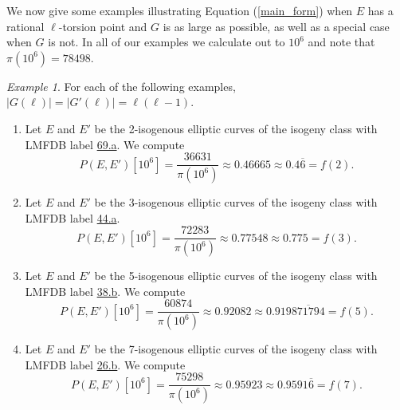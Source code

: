 \documentclass{amsart}
\numberwithin{equation}{section}
\theoremstyle{plain}
\theoremstyle{remark}
\newtheorem{exm}[equation]{Example}
\begin{document}
We now give some examples illustrating Equation (\ref{main_form}) when $E$ has a rational $\ell$-torsion point and $G$ is as large as possible, as well as a special case when $G$ is not.  In all of our examples we calculate out to $10^6$ and note that $\pi(10^6) = 78498$.

\begin{exm} For each of the following examples, $|G(\ell)| = |G'(\ell)| = \ell(\ell-1)$.  

\begin{enumerate}
\item Let $E$ and $E'$ be the 2-isogenous elliptic curves of the isogeny class with LMFDB label \href{https://beta.lmfdb.org/EllipticCurve/Q/69/a/}{69.a}.  We compute
\[
P(E,E')[10^6] = \frac{36631}{\pi(10^6)} \approx  0.46665 \approx 0.4\overline{6}  = f(2).
\]

\item Let $E$ and $E'$ be the 3-isogenous elliptic curves of the isogeny class with LMFDB label \href{https://beta.lmfdb.org/EllipticCurve/Q/44/a/}{44.a}.  
\[
P(E,E')[10^6] = \frac{72283}{\pi(10^6)} \approx  0.77548 \approx 0.775  = f(3).
\]

\item Let $E$ and $E'$ be the 5-isogenous elliptic curves of the isogeny class with LMFDB label \href{https://beta.lmfdb.org/EllipticCurve/Q/38/b/}{38.b}.  We compute
\[
P(E,E')[10^6] = \frac{60874}{\pi(10^6)} \approx  0.92082 \approx 0.919\overline{871794}  = f(5).
\]

\item Let $E$ and $E'$ be the 7-isogenous elliptic curves of the isogeny class with LMFDB label \href{https://beta.lmfdb.org/EllipticCurve/Q/26/b/}{26.b}.  We compute 
\[
P(E,E')[10^6] = \frac{75298}{\pi(10^6)}  \approx  0.95923 \approx 0.9591\overline{6}  = f(7).
\]
\end{enumerate}
\end{exm} 
\end{document}
